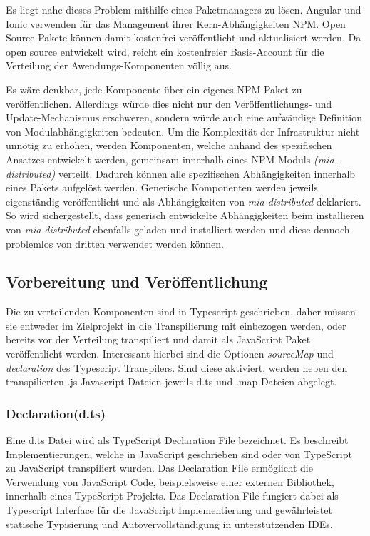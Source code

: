 Es liegt nahe dieses Problem mithilfe eines Paketmanagers zu lösen. Angular und Ionic verwenden für das Management
ihrer Kern-Abhängigkeiten \ac{NPM}.
Open Source Pakete können damit kostenfrei veröffentlicht und aktualisiert werden.
Da \projectname{} open source entwickelt wird,
reicht ein kostenfreier Basis-Account für die Verteilung der Awendungs-Komponenten völlig aus.

Es wäre denkbar, jede Komponente über ein eigenes \ac{NPM} Paket zu veröffentlichen.
Allerdings würde dies nicht nur den Veröffentlichungs- und Update-Mechanismus erschweren,
sondern würde auch eine aufwändige Definition von Modulabhängigkeiten bedeuten.
Um die Komplexität der Infrastruktur nicht unnötig zu erhöhen,
werden Komponenten, welche anhand des spezifischen Ansatzes entwickelt werden,
gemeinsam innerhalb eines \ac{NPM} Moduls \emph{(mia-distributed)} verteilt.
Dadurch können alle spezifischen Abhängigkeiten innerhalb eines Pakets aufgelöst werden.
Generische Komponenten werden jeweils eigenständig veröffentlicht und als Abhängigkeiten von \emph {mia-distributed} deklariert.
So wird sichergestellt, dass generisch entwickelte Abhängigkeiten beim installieren von \emph{mia-distributed}
ebenfalls geladen und installiert werden und diese dennoch problemlos von dritten verwendet werden können.

\subsection{Vorbereitung und Veröffentlichung}

Die zu verteilenden Komponenten sind in Typescript geschrieben,
daher müssen sie entweder im Zielprojekt in die Transpilierung mit einbezogen werden,
oder bereits vor der Verteilung transpiliert und damit als JavaScript Paket veröffentlicht werden.
Interessant hierbei sind die Optionen \emph{sourceMap} und \emph{declaration} des Typescript Transpilers.
Sind diese aktiviert, werden neben den transpilierten .js Javascript Dateien jeweils d.ts und .map Dateien abgelegt.

\subsubsection{Declaration(d.ts)}

Eine d.ts Datei wird als TypeScript Declaration File bezeichnet.
Es beschreibt Implementierungen, welche in JavaScript geschrieben sind oder von TypeScript zu JavaScript transpiliert wurden.
Das Declaration File ermöglicht die Verwendung von JavaScript Code, beispielsweise einer externen Bibliothek,
innerhalb eines TypeScript Projekts. Das Declaration File fungiert dabei als Typescript Interface
für die JavaScript Implementierung und gewährleistet statische Typisierung
und Autovervollständigung in unterstützenden IDEs.

